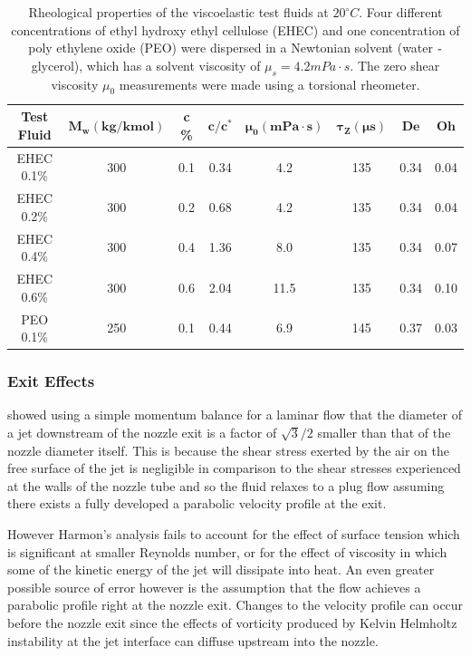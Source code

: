 \documentclass[11pt]{article}
\begin{document}
\begin{table}[t]
\begin{center}
	\begin{tabular}{c|c|c|c|c|c|c|c} \hline
		\textbf{Test Fluid} & $\mathbf{M_w (kg/kmol)}$ & \textbf{c \%} & 
$\mathbf{c/c^*}$ & $\mathbf{\mu_0 (mPa \cdot s)}$ & $\mathbf{\tau_Z (\mu s)}$ & 
$\mathbf{De}$ & $\mathbf{Oh}$  \\ \hline 
		EHEC 0.1\% & 300 & 0.1 & 0.34 & 4.2 & 135 & 0.34 &0.04 \\
		EHEC 0.2\% & 300 & 0.2 & 0.68 & 4.2 & 135 & 0.34 &0.04 \\
		EHEC 0.4\% & 300 & 0.4 & 1.36 & 8.0 & 135 & 0.34 &0.07 \\
		EHEC 0.6\% & 300 & 0.6 & 2.04 & 11.5 & 135 & 0.34 &0.10 \\
		PEO 0.1\% & 250 & 0.1 & 0.44 & 6.9 & 145 & 0.37 & 0.03\\ \hline
	\end{tabular}
	\caption{Rheological properties of the viscoelastic test fluids at $20^\circ 
C$. Four different concentrations of ethyl hydroxy ethyl cellulose (EHEC) and 
one concentration of poly ethylene oxide (PEO) were dispersed in a Newtonian 
solvent (water ${\text -}$ glycerol), which has a solvent viscosity of $\mu_s = 
4.2 mPa \cdot s$. The zero shear viscosity $\mu_0$ measurements were made using 
a torsional rheometer.}
	\label{tbl:rheo_prop}
\end{center}	
\end{table}

\subsubsection{Exit Effects}
\label{sec:exit}
\cite{harmon1955drop} showed using a simple momentum balance for a laminar flow 
that the diameter of a jet downstream of the nozzle exit is a factor of 
$\sqrt{3}/2$ smaller than that of the nozzle diameter itself. This is because 
the shear stress exerted by the air on the free surface of the jet is 
negligible in comparison to the shear stresses experienced at the walls of the 
nozzle tube and so the fluid relaxes to a plug flow assuming there exists a 
fully developed a parabolic velocity profile at the exit.

However Harmon's analysis fails to account for the effect of surface tension 
which is significant at smaller Reynolds number, or for the effect of viscosity 
in which some of the kinetic energy of the jet will dissipate into heat. An 
even greater possible source of error however is the assumption that the flow 
achieves a parabolic profile right at the nozzle exit. Changes to the velocity 
profile can occur before the nozzle exit since the effects of vorticity 
produced by Kelvin Helmholtz instability at the jet interface can diffuse 
upstream into the nozzle.
\end{document}
